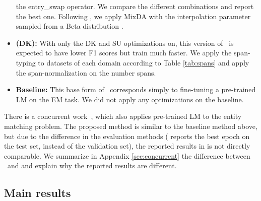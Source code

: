 \begin{itemize}
the entry\_swap operator. 
We compare the different combinations and report the best one.
Following \cite{miao2020snippext}, we apply MixDA with the interpolation parameter 
 sampled from a Beta distribution .
\item \textbf{\system (DK): } With only the DK and SU optimizations on, this version
of \system\ is expected to have lower F1 scores but train much faster.
We apply the span-typing to datasets of each domain according to Table \ref{tab:spans} and 
apply the span-normalization on the number spans.
\item \textbf{Baseline: } This base form of \system\ corresponds
simply to fine-tuning a pre-trained LM on the EM task. We did not apply any optimizations on the baseline.
\end{itemize}
There is a concurrent work~\cite{brunner2020entity}, which also applies pre-trained LM to the entity matching
problem. The proposed method is similar to the baseline method above, but due to the difference in the
evaluation methods (\cite{brunner2020entity} reports the best epoch on the test set, instead of the validation set),
the reported results in \cite{brunner2020entity} is not directly comparable.
We summarize in Appendix \ref{sec:concurrent} the difference between \system\ and \cite{brunner2020entity}
and explain why the reported results are different.

\vspace{-1mm}
\subsection{Main results}

\iffalse Table \ref{tab:magellan} shows the results on the ER-Magellan datasets.
Overall, \system\ achieves significantly higher F1 scores than the SOTA results (DeepMatcher+).
\system\ outperforms DeepMatcher+ in 10/13 cases and by up to 25\% (Dirty, Walmart-Amazon).
On the 3 cases that \system\ performs slightly worse than DeepMatcher+,
as we show in Table \ref{tab:albert}, these small gaps can be filled
by replacing DistilBERT with larger pre-trained LMs such as BERT or ALBERT.
\fi 

